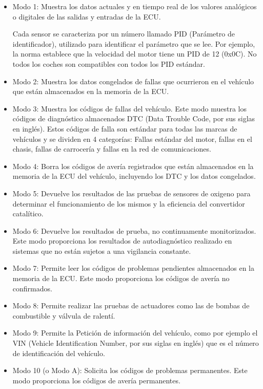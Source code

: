 \begin{itemize}


\item  Modo 1:  Muestra los datos actuales y en tiempo real de los valores analógicos o digitales de las salidas y entradas de la ECU.

Cada sensor se caracteriza por un número llamado PID (Parámetro de identificador), utilizado para identificar el parámetro que se lee. Por ejemplo, la norma establece que la velocidad del motor tiene un PID de 12 (0x0C). No todos los coches son compatibles con todos los PID estándar. 

\item Modo 2: Muestra los datos congelados de fallas que ocurrieron en el vehículo que están almacenados en la memoria de la ECU. 

\item Modo 3: Muestra los códigos de fallas del vehículo.
Este modo muestra los códigos de diagnóstico almacenados DTC (Data Trouble Code, por sus siglas en inglés). Estos códigos de falla son estándar para todas las marcas de vehículos y se dividen en 4 categorías: Fallas estándar del motor, fallas en el chasis, fallas de carrocería y fallas en la red de comunicaciones. 
   
\item Modo 4: Borra los códigos de avería registrados que están almacenados en la memoria de la ECU del vehículo,  incluyendo los DTC y los datos congelados. 

\item Modo 5: Devuelve los resultados de las pruebas de sensores de oxigeno para determinar el funcionamiento de los mismos y la eficiencia del convertidor catalítico.

\item Modo 6: Devuelve los resultados de prueba, no continuamente monitorizados. Este modo proporciona los resultados de autodiagnóstico realizado en sistemas que no están sujetos a una vigilancia constante.

\item Modo 7: Permite leer los códigos de problemas pendientes almacenados en la memoria de la ECU. Este modo proporciona los códigos de avería no confirmados. 

\item Modo 8: Permite realizar las pruebas de actuadores como las de bombas de combustible y válvula de ralentí. 

\item Modo 9: Permite la Petición de información del vehículo, como por ejemplo el VIN (Vehicle Identification Number, por sus siglas en inglés) que es el número de identificación del vehículo. 

\item Modo 10 (o Modo A): Solicita los códigos de problemas permanentes. Este modo proporciona los códigos de avería permanentes. 


\end{itemize}


